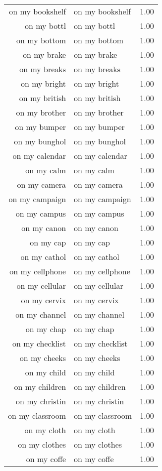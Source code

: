 \begin{table}[ht]
\begin{tabular}{rlr}
  on my bookshelf & on my bookshelf & 1.00 \\ 
  on my bottl & on my bottl & 1.00 \\ 
  on my bottom & on my bottom & 1.00 \\ 
  on my brake & on my brake & 1.00 \\ 
  on my breaks & on my breaks & 1.00 \\ 
  on my bright & on my bright & 1.00 \\ 
  on my british & on my british & 1.00 \\ 
  on my brother & on my brother & 1.00 \\ 
  on my bumper & on my bumper & 1.00 \\ 
  on my bunghol & on my bunghol & 1.00 \\ 
  on my calendar & on my calendar & 1.00 \\ 
  on my calm & on my calm & 1.00 \\ 
  on my camera & on my camera & 1.00 \\ 
  on my campaign & on my campaign & 1.00 \\ 
  on my campus & on my campus & 1.00 \\ 
  on my canon & on my canon & 1.00 \\ 
  on my cap & on my cap & 1.00 \\ 
  on my cathol & on my cathol & 1.00 \\ 
  on my cellphone & on my cellphone & 1.00 \\ 
  on my cellular & on my cellular & 1.00 \\ 
  on my cervix & on my cervix & 1.00 \\ 
  on my channel & on my channel & 1.00 \\ 
  on my chap & on my chap & 1.00 \\ 
  on my checklist & on my checklist & 1.00 \\ 
  on my cheeks & on my cheeks & 1.00 \\ 
  on my child & on my child & 1.00 \\ 
  on my children & on my children & 1.00 \\ 
  on my christin & on my christin & 1.00 \\ 
  on my classroom & on my classroom & 1.00 \\ 
  on my cloth & on my cloth & 1.00 \\ 
  on my clothes & on my clothes & 1.00 \\ 
  on my coffe & on my coffe & 1.00 \\ 

\end{tabular}
\end{table}
